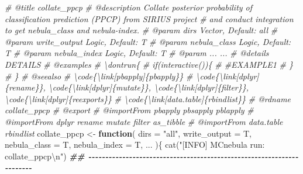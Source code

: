 \documentclass[
]{article}
\newenvironment{Shaded}{\begin{snugshade}}{\end{snugshade}}
\newcommand{\AttributeTok}[1]{\textcolor[rgb]{0.77,0.63,0.00}{#1}}
\newcommand{\CommentTok}[1]{\textcolor[rgb]{0.56,0.35,0.01}{\textit{#1}}}
\newcommand{\ControlFlowTok}[1]{\textcolor[rgb]{0.13,0.29,0.53}{\textbf{#1}}}
\newcommand{\DocumentationTok}[1]{\textcolor[rgb]{0.56,0.35,0.01}{\textbf{\textit{#1}}}}
\newcommand{\FunctionTok}[1]{\textcolor[rgb]{0.00,0.00,0.00}{#1}}
\newcommand{\NormalTok}[1]{#1}
\newcommand{\OtherTok}[1]{\textcolor[rgb]{0.56,0.35,0.01}{#1}}
\newcommand{\SpecialCharTok}[1]{\textcolor[rgb]{0.00,0.00,0.00}{#1}}
\newcommand{\StringTok}[1]{\textcolor[rgb]{0.31,0.60,0.02}{#1}}
\begin{document}
\begin{Shaded}
\begin{Highlighting}[]
\CommentTok{\#\textquotesingle{} @title collate\_ppcp}
\CommentTok{\#\textquotesingle{} @description Collate posterior probability of classification prediction (PPCP) from SIRIUS project}
\CommentTok{\#\textquotesingle{} and conduct integration to get nebula\_class and nebula{-}index.}
\CommentTok{\#\textquotesingle{} @param dirs Vector, Default: \textquotesingle{}all\textquotesingle{}}
\CommentTok{\#\textquotesingle{} @param write\_output Logic, Default: T}
\CommentTok{\#\textquotesingle{} @param nebula\_class Logic, Default: T}
\CommentTok{\#\textquotesingle{} @param nebula\_index Logic, Default: T}
\CommentTok{\#\textquotesingle{} @param ... ...}
\CommentTok{\#\textquotesingle{} @details DETAILS}
\CommentTok{\#\textquotesingle{} @examples }
\CommentTok{\#\textquotesingle{} \textbackslash{}dontrun\{}
\CommentTok{\#\textquotesingle{} if(interactive())\{}
\CommentTok{\#\textquotesingle{}  \#EXAMPLE1}
\CommentTok{\#\textquotesingle{}  \}}
\CommentTok{\#\textquotesingle{} \}}
\CommentTok{\#\textquotesingle{} @seealso }
\CommentTok{\#\textquotesingle{}  \textbackslash{}code\{\textbackslash{}link[pbapply]\{pbapply\}\}}
\CommentTok{\#\textquotesingle{}  \textbackslash{}code\{\textbackslash{}link[dplyr]\{rename\}\}, \textbackslash{}code\{\textbackslash{}link[dplyr]\{mutate\}\}, \textbackslash{}code\{\textbackslash{}link[dplyr]\{filter\}\}, \textbackslash{}code\{\textbackslash{}link[dplyr]\{reexports\}\}}
\CommentTok{\#\textquotesingle{}  \textbackslash{}code\{\textbackslash{}link[data.table]\{rbindlist\}\}}
\CommentTok{\#\textquotesingle{} @rdname collate\_ppcp}
\CommentTok{\#\textquotesingle{} @export }
\CommentTok{\#\textquotesingle{} @importFrom pbapply pbsapply pblapply}
\CommentTok{\#\textquotesingle{} @importFrom dplyr rename mutate filter as\_tibble}
\CommentTok{\#\textquotesingle{} @importFrom data.table rbindlist}
\NormalTok{collate\_ppcp }\OtherTok{\textless{}{-}} 
  \ControlFlowTok{function}\NormalTok{(}
           \AttributeTok{dirs =} \StringTok{"all"}\NormalTok{,}
           \AttributeTok{write\_output =}\NormalTok{ T,}
           \AttributeTok{nebula\_class =}\NormalTok{ T,}
           \AttributeTok{nebula\_index =}\NormalTok{ T,}
\NormalTok{           ...}
\NormalTok{           )\{}
    \FunctionTok{cat}\NormalTok{(}\StringTok{"[INFO] MCnebula run: collate\_ppcp}\SpecialCharTok{\textbackslash{}n}\StringTok{"}\NormalTok{)}
    \DocumentationTok{\#\# {-}{-}{-}{-}{-}{-}{-}{-}{-}{-}{-}{-}{-}{-}{-}{-}{-}{-}{-}{-}{-}{-}{-}{-}{-}{-}{-}{-}{-}{-}{-}{-}{-}{-}{-}{-}{-}{-}{-}{-}{-}{-}{-}{-}{-}{-}{-}{-}{-}{-}{-}{-}{-}{-}{-}{-}{-}{-}{-}{-}{-}{-}{-}{-}{-}{-}{-}{-}{-}{-} }

\end{Highlighting}
\end{Shaded}
\end{document}
